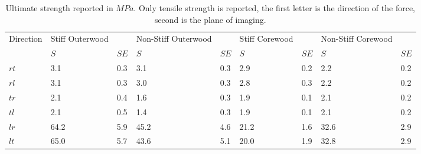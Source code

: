 \documentclass[10pt]{article}
\begin{document}
\begin{table}
\caption[Ultimate strength]{Ultimate strength reported in \(MPa\). Only tensile strength is reported, the first letter is the direction of the force, second is the plane of imaging.}
\label{table:ultimate strength}
\begin{tabular}{lllllllll}
\hline
Direction& Stiff Outerwood && Non-Stiff Outerwood && Stiff Corewood && Non-Stiff Corewood &\\
 & \(S\)&\(SE\)& \(S\)&\(SE\)& \(S\)&\(SE\)& \(S\)&\(SE\)\\
\hline
\(rt\) & 3.1 & 0.3& 3.1& 0.3& 2.9 & 0.2& 2.2 & 0.2 \\
\(rl\) & 3.1 & 0.3& 3.0& 0.3& 2.8 & 0.3& 2.2 & 0.2 \\
\(tr\) & 2.1 & 0.4& 1.6& 0.3& 1.9 & 0.1& 2.1 & 0.2 \\
\(tl\) & 2.1 & 0.5& 1.4& 0.3& 1.9 & 0.1& 2.1 & 0.2 \\
\(lr\) & 64.2 & 5.9& 45.2& 4.6& 21.2 & 1.6& 32.6 & 2.9 \\
\(lt\) & 65.0 & 5.7& 43.6& 5.1& 20.0 & 1.9& 32.8 & 2.9 \\
\hline
\end{tabular}
\end{table}
\end{document}
